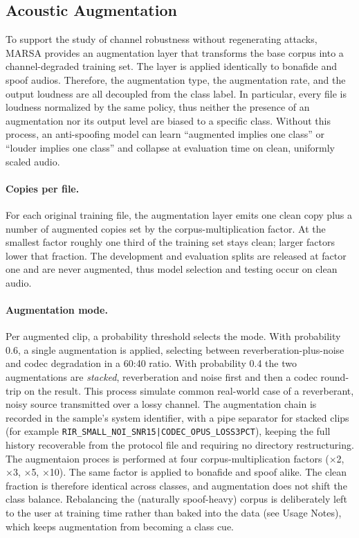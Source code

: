 \documentclass[11pt]{article}
\begin{document}
\FloatBarrier

\subsection*{Acoustic Augmentation}

To support the study of channel robustness without regenerating
attacks, MARSA provides an augmentation layer that transforms the base
corpus into a channel-degraded training set. The layer is applied
identically to bonafide and spoof audios. Therefore, the augmentation type, the augmentation rate, and
the output loudness are all decoupled from the class label. In particular,
every file is loudness normalized by the same policy, thus neither the presence of an
augmentation nor its output level are biased to a specific 
class. Without this process, an anti-spoofing model can learn ``augmented implies one class'' or ``louder implies one class'' and collapse at evaluation time on clean, uniformly scaled audio.

\paragraph{Copies per file.} For each original training file, the augmentation layer
emits one clean copy plus a number of augmented copies set by the 
corpus-multiplication factor. At the smallest factor
roughly one third of the training set stays clean; larger factors lower
that fraction. The development and evaluation splits are released at
factor one and are never augmented, thus model selection and testing
occur on clean audio.

\paragraph{Augmentation mode.} Per augmented clip, a probability threshold
selects the mode. With probability 0.6, a single augmentation is applied,
selecting between reverberation-plus-noise and codec degradation in a
60:40 ratio. With probability 0.4 the two augmentations are \emph{stacked},
reverberation and noise first and then a codec round-trip on the result.
This process simulate common real-world case of a reverberant, noisy source
transmitted over a lossy channel. The augmentation chain is recorded in
the sample's system identifier, with a pipe separator for stacked clips
(for example \texttt{RIR\_SMALL\_NOI\_SNR15|CODEC\_OPUS\_LOSS3PCT}),
keeping the full history recoverable from the protocol file and
requiring no directory restructuring. The augmentaion proces is performed at four
corpus-multiplication factors ($\times$2, $\times$3, $\times$5,
$\times$10). The same factor is applied to bonafide and spoof alike. The
clean fraction is therefore identical across classes, and augmentation
does not shift the class balance. Rebalancing the (naturally spoof-heavy) corpus
is deliberately left to the user at training time rather than baked into
the data (see Usage Notes), which keeps augmentation from becoming a
class cue.
\end{document}
